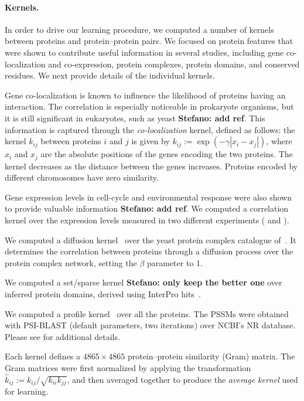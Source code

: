 \documentclass{bioinfo}
\newcommand{\stefano}[1]{{\bf \textcolor{alizarin}{{Stefano: #1}}}}
\begin{document}
\paragraph{Kernels.} In order to drive our learning procedure, we computed a
number of kernels between proteins and protein--protein pairs. We focused on
protein features that were shown to contribute useful information in several
studies, including gene co-localization and co-expression, protein complexes,
protein domains, and conserved residues. We next provide details of the
individual kernels.

Gene co-localization is known to influence the likelihood of proteins having an
interaction. The correlation is especially noticeable in prokaryote organisms,
but it is still significant in eukaryotes, such as yeast \stefano{add ref}.
This information is captured through the {\em co-localization} kernel, defined
as follows: the kernel $k_{ij}$ between proteins $i$ and $j$ is given by
%
$k_{ij} := \exp\left( - \gamma | x_i - x_j | \right)$,
%
where $x_i$ and $x_j$ are the absolute positions of the genes encoding the two
proteins. The kernel decreases as the distance between the genes increases.
Proteins encoded by different chromosomes have zero similarity.

Gene expression levels in cell-cycle and environmental response were also shown
to provide valuable information \stefano{add ref}. We computed a correlation
kernel over the expression levels measured in two different experiments
(\cite{spellman1998comprehensive} and \cite{gasch2000genomic}).

We computed a diffusion kernel~\cite{kondor2002diffusion} over
the yeast protein complex catalogue of~\cite{pu2009up}. It determines the
correlation between proteins through a diffusion process over the protein
complex network, setting the $\beta$ parameter to 1.

We computed a set/sparse kernel \stefano{only keep the better one} over
inferred protein domains, derived using InterPro
hits~\cite{mitchell2015interpro}.

We computed a profile kernel~\cite{kuang2005profile,hamp2013accelerating} over
all the proteins. The PSSMs were obtained with PSI-BLAST (default parameters,
two iterations) over NCBI's NR database. Please see \cite{kuang2005profile}
for additional details.

Each kernel defines a $4865 \times 4865$ protein--protein similarity (Gram)
matrix. The Gram matrices were first normalized by applying the
transformation $\hat{k}_{ij} := k_{ij}/\sqrt{k_{ii} k_{jj}}$, and then
averaged together to produce the {\em average kernel} used for learning.
\end{document}
